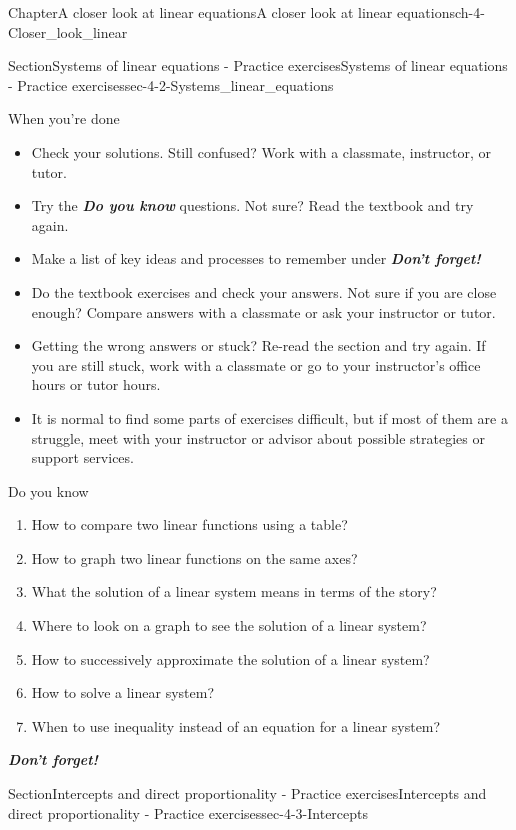 \documentclass[twoside,11pt,]{book}
\newcommand{\alert}[1]{\textbf{\textit{#1}}}
\numberwithin{equation}{section}
\begin{document}
\begin{chapterptx}{Chapter}{A closer look at linear equations}{}{A closer look at linear equations}{}{}{ch-4-Closer_look_linear}
\begin{sectionptx}{Section}{Systems of linear equations - Practice exercises}{}{Systems of linear equations - Practice exercises}{}{}{sec-4-2-Systems_linear_equations}
\begin{conclusion}{When you're done \textellipsis{}}
%
\begin{itemize}[label=\textbullet]
\item{}Check your solutions. Still confused? Work with a classmate, instructor, or tutor.%
\item{}Try the \alert{Do you know} questions. Not sure? Read the textbook and try again.%
\item{}Make a list of key ideas and processes to remember under \alert{Don't forget!}%
\item{}Do the textbook exercises and check your answers. Not sure if you are close enough? Compare answers with a classmate or ask your instructor or tutor.%
\item{}Getting the wrong answers or stuck? Re-read the section and try again. If you are still stuck, work with a classmate or go to your instructor's office hours or tutor hours.%
\item{}It is normal to find some parts of exercises difficult, but if most of them are a struggle, meet with your instructor or advisor about possible strategies or support services.%
\end{itemize}
%
\end{conclusion}%
\begin{conclusion}{Do you know \textellipsis{}}%
%
\begin{enumerate}[label={\Alph*.}]
\item{}How to compare two linear functions using a table?%
\item{}How to graph two linear functions on the same axes?%
\item{}What the solution of a linear system means in terms of the story?%
\item{}Where to look on a graph to see the solution of a linear system?%
\item{}How to successively approximate the solution of a linear system?%
\item{}How to solve a linear system?%
\item{}When to use inequality instead of an equation for a linear system?%
\end{enumerate}
%
\par
\alert{Don't forget!}%
\end{conclusion}%
\end{sectionptx}
%
%
\typeout{************************************************}
\typeout{************************************************}
%
\begin{sectionptx}{Section}{Intercepts and direct proportionality - Practice exercises}{}{Intercepts and direct proportionality - Practice exercises}{}{}{sec-4-3-Intercepts}

\end{sectionptx}
\end{chapterptx}
\end{document}
